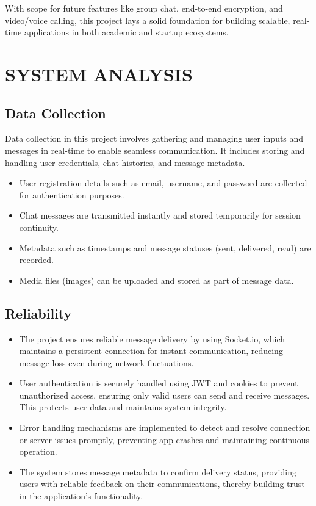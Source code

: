 \documentclass[12pt,a4paper]{report}
\begin{document}
With scope for future features like group chat, end-to-end encryption, and video/voice calling, this project lays a solid foundation for building scalable, real-time applications in both academic and startup ecosystems.



\newpage
\chapter{SYSTEM ANALYSIS}

\section{Data Collection}
Data collection in this project involves gathering and managing user inputs and messages in real-time to enable seamless communication. It includes storing and handling user credentials, chat histories, and message metadata.

\begin{itemize}
    \item User registration details such as email, username, and password are collected for authentication purposes.
    \item Chat messages are transmitted instantly and stored temporarily for session continuity.
    \item Metadata such as timestamps and message statuses (sent, delivered, read) are recorded.
    \item Media files (images) can be uploaded and stored as part of message data.
\end{itemize}

\section{Reliability}
\begin{itemize}
    \item The project ensures reliable message delivery by using Socket.io, which maintains a persistent connection for instant communication, reducing message loss even during network fluctuations.
    \item User authentication is securely handled using JWT and cookies to prevent unauthorized access, ensuring only valid users can send and receive messages. This protects user data and maintains system integrity.
    \item Error handling mechanisms are implemented to detect and resolve connection or server issues promptly, preventing app crashes and maintaining continuous operation.
    \item The system stores message metadata to confirm delivery status, providing users with reliable feedback on their communications, thereby building trust in the application’s functionality.
\end{itemize}
\end{document}
